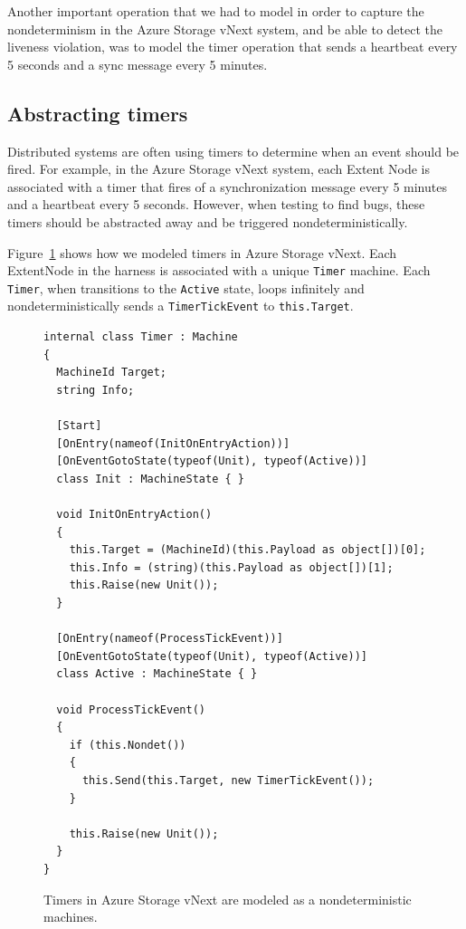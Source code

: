 Another important operation that we had to model in order to capture the nondeterminism in  the Azure Storage vNext system, and be able to detect the liveness violation, was to model the timer operation that sends a heartbeat every 5 seconds and a sync message every 5 minutes.

\subsection{Abstracting timers}
\label{sec:method:timers}

Distributed systems are often using timers to determine when an event should be fired. For example, in the Azure Storage vNext system, each Extent Node is associated with a timer that fires of a synchronization message every 5 minutes and a heartbeat every 5 seconds. However, when testing to find bugs, these timers should be abstracted away and be triggered nondeterministically.

Figure~\ref{fig:timer} shows how we modeled timers in Azure Storage vNext. Each ExtentNode in the harness is associated with a unique \texttt{Timer} machine. Each \texttt{Timer}, when transitions to the \texttt{Active} state, loops infinitely and nondeterministically sends a \texttt{TimerTickEvent} to \texttt{this.Target}.

\begin{figure}[t]
\begin{lstlisting}
internal class Timer : Machine
{
  MachineId Target;
  string Info;

  [Start]
  [OnEntry(nameof(InitOnEntryAction))]
  [OnEventGotoState(typeof(Unit), typeof(Active))]
  class Init : MachineState { }

  void InitOnEntryAction()
  {
    this.Target = (MachineId)(this.Payload as object[])[0];
    this.Info = (string)(this.Payload as object[])[1];
    this.Raise(new Unit());
  }

  [OnEntry(nameof(ProcessTickEvent))]
  [OnEventGotoState(typeof(Unit), typeof(Active))]
  class Active : MachineState { }

  void ProcessTickEvent()
  {
    if (this.Nondet())
    {
      this.Send(this.Target, new TimerTickEvent());
    }

    this.Raise(new Unit());
  }
}
\end{lstlisting}
\vspace{-2mm}
\caption{Timers in Azure Storage vNext are modeled as a nondeterministic \psharp machines.}
\label{fig:timer}
\end{figure}

